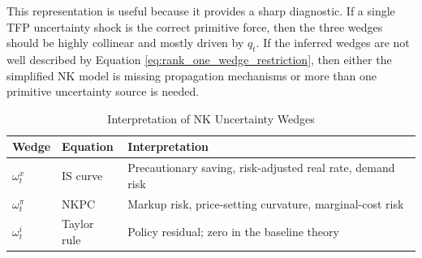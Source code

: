 This representation is useful because it provides a sharp diagnostic. If a
single TFP uncertainty shock is the correct primitive force, then the three
wedges should be highly collinear and mostly driven by \(q_t\). If the inferred
wedges are not well described by Equation \eqref{eq:rank_one_wedge_restriction},
then either the simplified NK model is missing propagation mechanisms or more
than one primitive uncertainty source is needed.

\begin{table}[htbp]
\centering
\caption{Interpretation of NK Uncertainty Wedges}
\label{tab:wedge_interpretation}
\begin{tabular}{lll}
\toprule
Wedge & Equation & Interpretation \\
\midrule
\(\omega^x_t\) & IS curve & Precautionary saving, risk-adjusted real rate, demand risk \\
\(\omega^\pi_t\) & NKPC & Markup risk, price-setting curvature, marginal-cost risk \\
\(\omega^i_t\) & Taylor rule & Policy residual; zero in the baseline theory \\
\bottomrule
\end{tabular}
\end{table}

